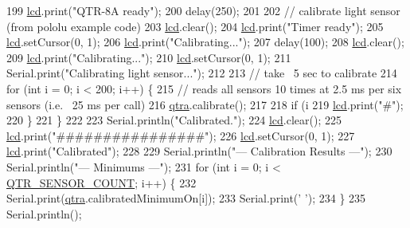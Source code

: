 \begin{DoxyCode}
199     \hyperlink{rbe2001_8ino_a4cbb289153633c01a1584b3aa0d9a0a2}{lcd}.print(\textcolor{stringliteral}{"QTR-8A ready"});
200     delay(250);
201 
202     \textcolor{comment}{// calibrate light sensor (from pololu example code)}
203     \hyperlink{rbe2001_8ino_a4cbb289153633c01a1584b3aa0d9a0a2}{lcd}.clear();
204     \hyperlink{rbe2001_8ino_a4cbb289153633c01a1584b3aa0d9a0a2}{lcd}.print(\textcolor{stringliteral}{"Timer ready"});
205     \hyperlink{rbe2001_8ino_a4cbb289153633c01a1584b3aa0d9a0a2}{lcd}.setCursor(0, 1);
206     \hyperlink{rbe2001_8ino_a4cbb289153633c01a1584b3aa0d9a0a2}{lcd}.print(\textcolor{stringliteral}{"Calibrating..."});
207     delay(100);
208     \hyperlink{rbe2001_8ino_a4cbb289153633c01a1584b3aa0d9a0a2}{lcd}.clear();
209     \hyperlink{rbe2001_8ino_a4cbb289153633c01a1584b3aa0d9a0a2}{lcd}.print(\textcolor{stringliteral}{"Calibrating..."});
210     \hyperlink{rbe2001_8ino_a4cbb289153633c01a1584b3aa0d9a0a2}{lcd}.setCursor(0, 1);
211     Serial.print(\textcolor{stringliteral}{"Calibrating light sensor..."});
212 
213     \textcolor{comment}{// take ~5 sec to calibrate}
214     \textcolor{keywordflow}{for} (\textcolor{keywordtype}{int} i = 0; i < 200; i++) \{
215         \textcolor{comment}{// reads all sensors 10 times at 2.5 ms per six sensors (i.e. ~25 ms per call)}
216         \hyperlink{rbe2001_8ino_aba1edf1920db9237b941ca0f77abbaae}{qtra}.calibrate();
217 
218         \textcolor{keywordflow}{if} (i %
219             \hyperlink{rbe2001_8ino_a4cbb289153633c01a1584b3aa0d9a0a2}{lcd}.print(\textcolor{stringliteral}{"#"});
220         \}
221     \}
222 
223     Serial.println(\textcolor{stringliteral}{"Calibrated."});
224     \hyperlink{rbe2001_8ino_a4cbb289153633c01a1584b3aa0d9a0a2}{lcd}.clear();
225     \hyperlink{rbe2001_8ino_a4cbb289153633c01a1584b3aa0d9a0a2}{lcd}.print(\textcolor{stringliteral}{"################"});
226     \hyperlink{rbe2001_8ino_a4cbb289153633c01a1584b3aa0d9a0a2}{lcd}.setCursor(0, 1);
227     \hyperlink{rbe2001_8ino_a4cbb289153633c01a1584b3aa0d9a0a2}{lcd}.print(\textcolor{stringliteral}{"Calibrated"});
228 
229     Serial.println(\textcolor{stringliteral}{"--- Calibration Results ---"});
230     Serial.println(\textcolor{stringliteral}{"--- Minimums ---"});
231     \textcolor{keywordflow}{for} (\textcolor{keywordtype}{int} i = 0; i < \hyperlink{config_8h_a3564cf3b48686cd6404dd989384a56c4}{QTR\_SENSOR\_COUNT}; i++) \{
232         Serial.print(\hyperlink{rbe2001_8ino_aba1edf1920db9237b941ca0f77abbaae}{qtra}.calibratedMinimumOn[i]);
233         Serial.print(\textcolor{charliteral}{' '});
234     \}
235     Serial.println();

\end{DoxyCode}
